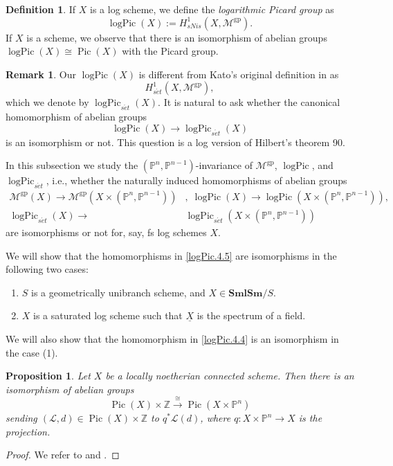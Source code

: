 \documentclass[11pt, a4paper]{amsart}
\newtheorem{prop}[thm]{Proposition}
\theoremstyle{definition}
\newtheorem{df}[thm]{Definition}
\newtheorem{rmk}[thm]{Remark}
\numberwithin{equation}{subsection}
\newcommand{\Z}{\mathbb{Z}}
\renewcommand{\P}{\mathbb{P}}
\newcommand{\SmlSm}{\mathbf{SmlSm}}
\newcommand{\Pic}{\operatorname{Pic}}		 %
\renewcommand{\ul}{\underline}
\newcommand{\gp}{{\mathrm{gp}}}
\newcommand{\set}{{s\acute{e}t}}
\newcommand{\logPic}{\operatorname{logPic}}
\newcommand{\cL}{\mathcal{L}}
\newcommand{\cM}{\mathcal{M}}
\begin{document}
\begin{df}
If $X$ is a log scheme, 
we define the \emph{logarithmic Picard group}\index[notation]{logPic @ $\logPic$} 
as 
\begin{equation}
\label{logPic.4.3}
\logPic(X)
:=
H_{sNis}^1(X,\cM^{\gp}).
\end{equation}
If $X$ is a scheme, we observe that there is an isomorphism of abelian groups $\logPic(X)\cong \Pic(X)$ with the Picard group.
\end{df}
\begin{rmk}
Our $\logPic(X)$ is different from Kato's original definition in \cite{zbMATH00721812} as 
\[
H_{\set}^1(X,\cM^{\gp}),
\]
which we denote by $\logPic_{\set}(X)$.
It is natural to ask whether the canonical homomorphism of abelian groups
\begin{equation}
\label{logPic.4.4}
\logPic(X)
\to
\logPic_{\set}(X)
\end{equation}
is an isomorphism or not.
This question is a log version of Hilbert's theorem 90.
\end{rmk}



In this subsection we study the $(\P^n,\P^{n-1})$-invariance of $\cM^{\gp}$, $\logPic$, and $\logPic_{\set}$, 
i.e., whether the naturally induced homomorphisms of abelian groups
\begin{equation}
\label{logPic.4.5}
\begin{split}
\cM^{\gp}(X) \to \cM^{\gp}(X\times  (\P^n,\P^{n-1}))
&,\;
\logPic(X)\to \logPic(X\times  (\P^n,\P^{n-1}))
,
\\
\logPic_{\set}(X)\to &\logPic_{\set}(X\times  (\P^n,\P^{n-1}))
\end{split}
\end{equation}
are isomorphisms or not for, say,  fs log schemes $X$.

We will show that the homomorphisms in \eqref{logPic.4.5} are isomorphisms in the following two cases:
\begin{enumerate}
\item[(1)] $S$ is a geometrically unibranch scheme, and $X\in \SmlSm/S$.
\item[(2)] $X$ is a saturated log scheme such that $\ul{X}$ is the spectrum of a field.
\end{enumerate}
We will also show that the homomorphism in \eqref{logPic.4.4} is an isomorphism in the case (1).


\begin{prop}
\label{logPic.7}
Let $X$ be a locally noetherian connected scheme.
Then there is an isomorphism of abelian groups
\[
\Pic(X)\times \Z
\xrightarrow{\cong}
\Pic(X\times \P^n)
\]
sending $(\cL,d)\in \Pic(X)\times \Z$ to $q^*\cL(d)$, where $q\colon X\times \P^n\to X$ is the projection.
\end{prop}
\begin{proof}
We refer to \cite[Remarque II.4.2.7]{EGA} and \cite[Proposition 3, Lecture 13]{zbMATH03299277}.
\end{proof}
\end{document}
